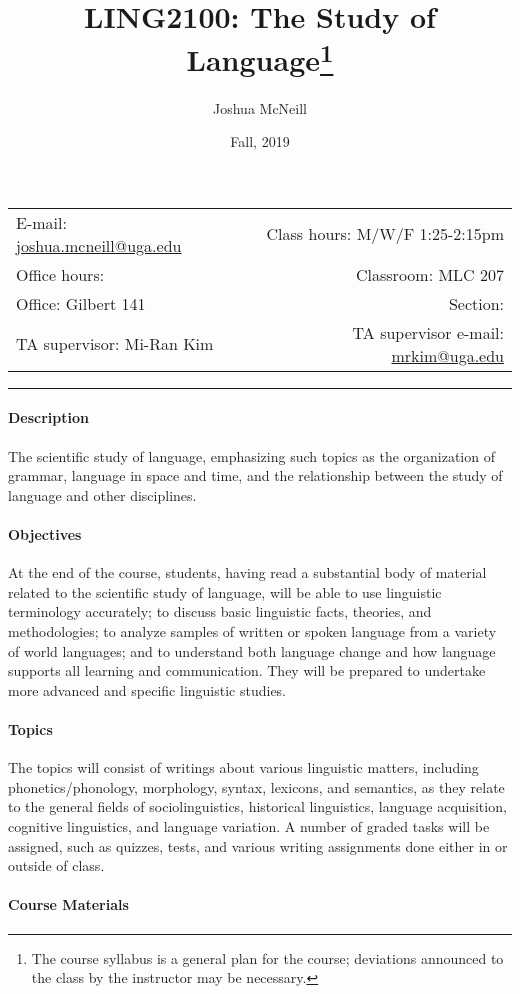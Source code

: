 \documentclass{article}
\title{LING2100: The Study of Language\footnote{The course syllabus is a general plan for the course; deviations announced to the class by the instructor may be necessary.}}
\author{Joshua McNeill}
\date{Fall, 2019}
\begin{document}
  \maketitle

  \begin{tabular}{l r}
    E-mail: \url{joshua.mcneill@uga.edu} & Class hours: M/W/F 1:25-2:15pm\\
    Office hours: & Classroom: MLC 207\\
    Office: Gilbert 141 & Section:\\
    TA supervisor: Mi-Ran Kim & TA supervisor e-mail: \url{mrkim@uga.edu}
  \end{tabular}

  \hrule

  \paragraph{Description}
    The scientific study of language, emphasizing such topics as the organization of grammar, language in space and time, and the relationship between the study of language and other disciplines.

  \paragraph{Objectives}
    At the end of the course, students, having read a substantial body of material related to the scientific study of language, will be able to use linguistic terminology accurately; to discuss basic linguistic facts, theories, and methodologies; to analyze samples of written or spoken language from a variety of world languages; and to understand both language change and how language supports all learning and communication. They will be prepared to undertake more advanced and specific linguistic studies.

  \paragraph{Topics}
    The topics will consist of writings about various linguistic matters, including phonetics/phonology, morphology, syntax, lexicons, and semantics, as they relate to the general fields of sociolinguistics, historical linguistics, language acquisition, cognitive linguistics, and language variation. A number of graded tasks will be assigned, such as quizzes, tests, and various writing assignments done either in or outside of class.

  \paragraph{Course Materials}
\end{document}
